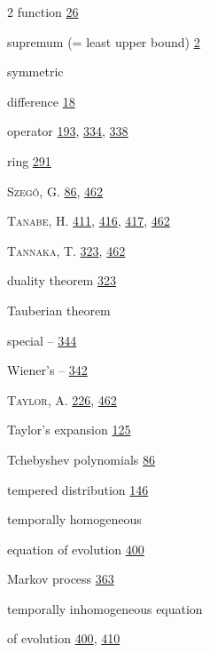 \begin{multicols}{2}
\hspace*{1.1em}function \hyperlink{page.26}{26}\par
\noindent supremum (= least upper bound) \hyperlink{page.2}{2}\par
\noindent symmetric\par
\hspace*{1.1em}difference \hyperlink{page.18}{18}\par
\hspace*{1.1em}operator \hyperlink{page.193}{193}, \hyperlink{page.334}{334}, \hyperlink{page.338}{338}\par
\hspace*{1.1em}ring \hyperlink{page.291}{291}\par
\noindent \textsc{Szegő}, G. \hyperlink{page.86}{86}, \hyperlink{page.462}{462}\par
\noindent \textsc{Tanabe}, H. \hyperlink{page.411}{411}, \hyperlink{page.416}{416}, \hyperlink{page.417}{417}, \hyperlink{page.462}{462}\par
\noindent \textsc{Tannaka}, T. \hyperlink{page.323}{323}, \hyperlink{page.462}{462}\par
\hspace*{1.1em}duality theorem \hyperlink{page.323}{323}\par
\noindent Tauberian theorem\par
\hspace*{1.1em}special -- \hyperlink{page.344}{344}\par
\hspace*{1.1em}Wiener's -- \hyperlink{page.342}{342}\par
\noindent \textsc{Taylor}, A. \hyperlink{page.226}{226}, \hyperlink{page.462}{462}\par
\noindent Taylor's expansion \hyperlink{page.125}{125}\par
\noindent Tchebyshev polynomials \hyperlink{page.86}{86}\par
\noindent tempered distribution \hyperlink{page.146}{146}\par
\noindent temporally homogeneous\par
\hspace*{1.1em}equation of evolution \hyperlink{page.400}{400}\par
\hspace*{1.1em}Markov process \hyperlink{page.363}{363}\par
\noindent temporally inhomogeneous equation\par
\hspace*{1.1em}of evolution \hyperlink{page.400}{400}, \hyperlink{page.410}{410}\par

\end{multicols}
